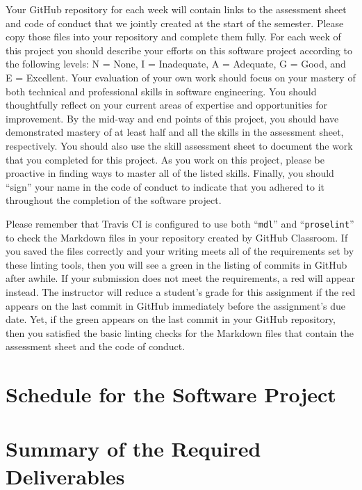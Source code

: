 \documentclass[11pt]{article}
\newcommand{\command}[1]{``\lstinline{#1}''}
\newcommand{\checkmark}{\ding{51}}
\newcommand{\naughtmark}{\ding{55}}
\begin{document}
Your GitHub repository for each week will contain links to the assessment sheet
and code of conduct that we jointly created at the start of the semester. Please
copy those files into your repository and complete them fully. For each week of
this project you should describe your efforts on this software project according
to the following levels: N = None, I = Inadequate, A = Adequate, G = Good, and E
= Excellent. Your evaluation of your own work should focus on your mastery of
both technical and professional skills in software engineering. You should
thoughtfully reflect on your current areas of expertise and opportunities for
improvement. By the mid-way and end points of this project, you should have
demonstrated mastery of at least half and all the skills in the assessment
sheet, respectively. You should also use the skill assessment sheet to document
the work that you completed for this project. As you work on this project,
please be proactive in finding ways to master all of the listed skills. Finally,
you should ``sign'' your name in the code of conduct to indicate that you
adhered to it throughout the completion of the software project.


Please remember that Travis CI is configured to use both \command{mdl} and
\command{proselint} to check the Markdown files in your repository created by
GitHub Classroom.
%
If you saved the files correctly and your writing meets all of the requirements
set by these linting tools, then you will see a green \checkmark{} in the
listing of commits in GitHub after awhile. If your submission does not meet the
requirements, a red \naughtmark{} will appear instead. The instructor will
reduce a student's grade for this assignment if the red \naughtmark{} appears on
the last commit in GitHub immediately before the assignment's due date. Yet, if
the green \checkmark{} appears on the last commit in your GitHub repository,
then you satisfied the basic linting checks for the Markdown files that contain
the assessment sheet and the code of conduct.

\section*{Schedule for the Software Project}


\section*{Summary of the Required Deliverables}
\end{document}
